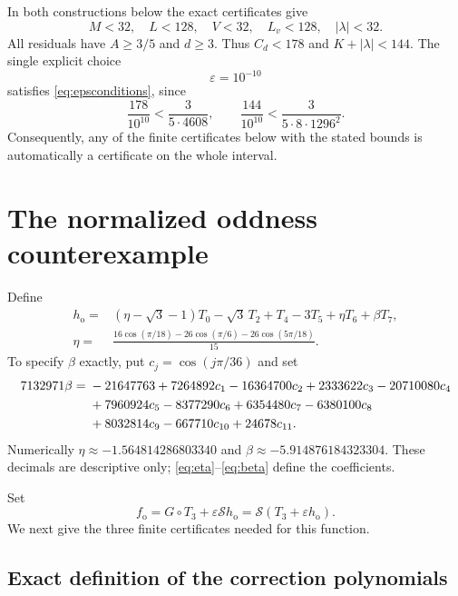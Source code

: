 \documentclass[11pt]{article}
\theoremstyle{remark}\newtheorem{remark}[theorem]{Remark}
\newcommand{\eps}{\varepsilon}
\begin{document}
In both constructions below the exact certificates give
\begin{equation}\label{eq:universalbounds}
 M<32,\quad L<128,\quad V<32,\quad L_v<128,\quad|\lambda|<32.
\end{equation}
All residuals have $A\ge3/5$ and $d\ge3$. Thus $C_d<178$ and
$K+|\lambda|<144$. The single explicit choice
\begin{equation}\label{eq:epsilon}
 \eps=10^{-10}
\end{equation}
satisfies \eqref{eq:epsconditions}, since
\[
 \frac{178}{10^{10}}<\frac{3}{5\cdot4608},\qquad
 \frac{144}{10^{10}}<\frac{3}{5\cdot8\cdot1296^2}.
\]
Consequently, any of the finite certificates below with the stated bounds
is automatically a certificate on the whole interval.

\section{The normalized oddness counterexample}

Define
\begin{align}
 h_{\mathrm{o}}={}&(\eta-\sqrt3-1)T_0-\sqrt3\,T_2+T_4-3T_5
                  +\eta T_6+\beta T_7,\label{eq:oddh}\\
 \eta={}&\frac{16\cos(\pi/18)-26\cos(\pi/6)-26\cos(5\pi/18)}{15}.
 \label{eq:eta}
\end{align}
To specify $\beta$ exactly, put $c_j=\cos(j\pi/36)$ and set
\begin{align}
 7132971\beta={}&-21647763+7264892c_1-16364700c_2+2333622c_3
 -20710080c_4\notag\\
 &+7960924c_5-8377290c_6+6354480c_7-6380100c_8\notag\\
 &+8032814c_9-667710c_{10}+24678c_{11}.
 \label{eq:beta}
\end{align}
Numerically $\eta\approx-1.564814286803340$ and
$\beta\approx-5.914876184323304$. These decimals are descriptive only;
\eqref{eq:eta}--\eqref{eq:beta} define the coefficients.

Set
\begin{equation}\label{eq:fo}
 f_{\mathrm{o}}=G\circ T_3+\eps\mathcal S h_{\mathrm{o}}
 =\mathcal S(T_3+\eps h_{\mathrm{o}}).
\end{equation}
We next give the three finite certificates needed for this function.

\subsection{Exact definition of the correction polynomials}
\end{document}
